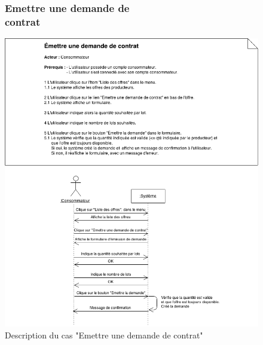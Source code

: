 \documentclass[12pt]{report}
\begin{document}
\begin{figure}[!h]
\centering
\subsubsection{Emettre une demande de contrat~~~~~~~~~~~~~~~~~~~~~~~~~~~}
\includegraphics[width=1.\textwidth]{./ressources/desc_UC_emettre_demande.png}
\caption{Description du cas "Emettre une demande de contrat"}
\end{figure}
\clearpage
\end{document}
